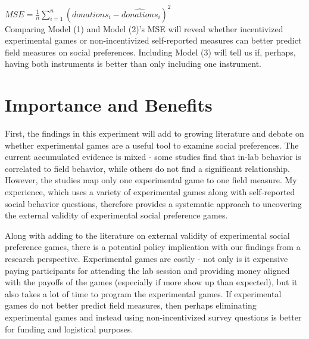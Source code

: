 \documentclass[12pt]{article}
\begin{document}
\( MSE = \frac{1}{n}\sum_{i=1}^{n}(donations_{i}-\hat{donations}_{i})^{2} \) \\


Comparing Model (1) and Model (2)\rq s MSE will reveal whether incentivized experimental games or non-incentivized self-reported measures can better predict field measures on social preferences. Including Model (3) will tell us if, perhaps, having both instruments is better than only including one instrument.


\section{Importance and Benefits}

First, the findings in this experiment will add to growing literature and debate on whether experimental games are a useful tool to examine social preferences. The current accumulated evidence is mixed - some studies find that in-lab behavior is correlated to field behavior, while others do not find a significant relationship. However, the studies map only one experimental game to one field measure. My experience, which uses a variety of experimental games along with self-reported social behavior questions, therefore provides a systematic approach to uncovering the external validity of experimental social preference games. 

Along with adding to the literature on external validity of experimental social preference games, there is a potential policy implication with our findings from a research perspective. Experimental games are costly - not only is it expensive paying participants for attending the lab session and providing money aligned with the payoffs of the games (especially if more show up than expected), but it also takes a lot of time to program the experimental games. If experimental games do not better predict field measures, then perhaps eliminating experimental games and instead using non-incentivized survey questions is better for funding and logistical purposes. 
\end{document}
